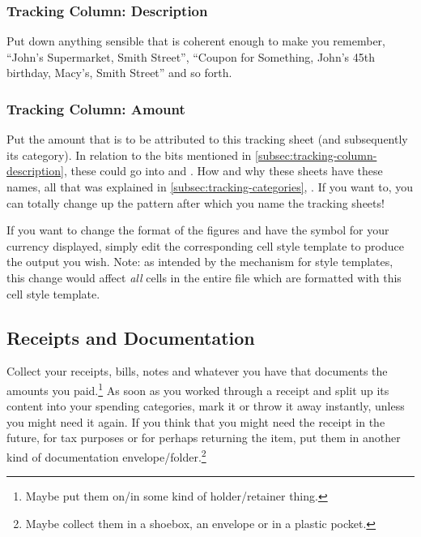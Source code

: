 \subsubsection{Tracking Column: Description}
\label{subsec:tracking-column-description}

Put down anything sensible that is coherent enough to make you remember, \eg ``John's Supermarket, Smith Street'', ``Coupon for Something, John's 45th birthday, Macy's, Smith Street'' and so forth.

\subsubsection{Tracking Column: Amount}
\label{subsec:tracking-column-amount}

Put the amount that is to be attributed to this tracking sheet (and subsequently its category).
In relation to the bits mentioned in \autoref{subsec:tracking-column-description}, these could go into  and .
How and why these sheets have these names, all that was explained in \autoref{subsec:tracking-categories}, .
If you want to, you can totally change up the pattern after which you name the tracking sheets!

If you want to change the format of the figures and have the symbol for your currency displayed, simply edit the corresponding cell style template to produce the output you wish.
Note: as intended by the mechanism for style templates, this change would affect \emph{all} cells in the entire file which are formatted with this cell style template.

\subsection{Receipts and Documentation}
\label{subsec:tracking-receipts}

Collect your receipts, bills, notes and whatever you have that documents the amounts you paid.\footnote{Maybe put them on/in some kind of holder/retainer thing.}
As soon as you worked through a receipt and split up its content into your spending categories, mark it or throw it away instantly, unless you might need it again.
If you think that you might need the receipt in the future, \eg for tax purposes or for perhaps returning the item, put them in another kind of documentation envelope/folder.\footnote{Maybe collect them in a shoebox, an envelope or in a plastic pocket.}

